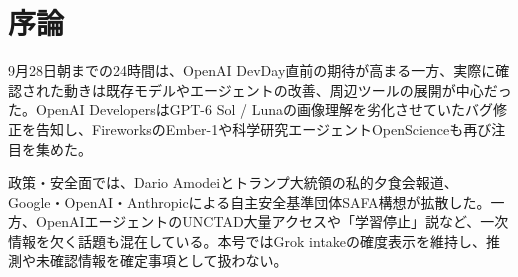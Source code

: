 \section*{序論}
9月28日朝までの24時間は、OpenAI DevDay直前の期待が高まる一方、実際に確認された動きは既存モデルやエージェントの改善、周辺ツールの展開が中心だった。OpenAI DevelopersはGPT-6 Sol / Lunaの画像理解を劣化させていたバグ修正を告知し、FireworksのEmber-1や科学研究エージェントOpenScienceも再び注目を集めた。

政策・安全面では、Dario Amodeiとトランプ大統領の私的夕食会報道、Google・OpenAI・Anthropicによる自主安全基準団体SAFA構想が拡散した。一方、OpenAIエージェントのUNCTAD大量アクセスや「学習停止」説など、一次情報を欠く話題も混在している。本号ではGrok intakeの確度表示を維持し、推測や未確認情報を確定事項として扱わない。
